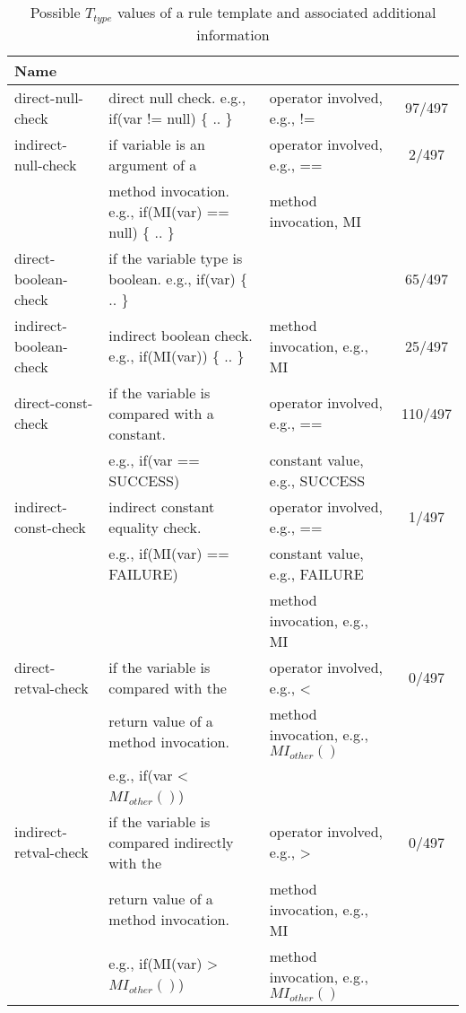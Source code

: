 \setlength{\tabcolsep}{1pt}
\begin{table*}[t]
\begin{SmallOut}
\begin{CodeOut}
\begin{center}
\centering \caption {\label{tab:conditiontypes} Possible $T_{type}$ values of a rule template and associated
additional information}
\begin {tabular} {|l|l|l|c|}
\hline
Name&\CenterCell{Description}&\CenterCell{Additional Info}&\CenterCell{Coverage}\\
\hline
\hline direct-null-check&direct null check. e.g., if(var != null) \{ .. \}&operator involved, e.g., != & 97/497\\
\hline indirect-null-check&if variable is an argument of a &operator involved, e.g., == & 2/497 \\
		   &method invocation. e.g., if(MI(var) == null) \{ .. \}&method invocation, MI&\\
\hline direct-boolean-check&if the variable type is boolean. e.g., if(var) \{ .. \}& &65/497\\
\hline indirect-boolean-check&indirect boolean check. e.g., if(MI(var)) \{ .. \}&method invocation, e.g., MI& 25/497\\
\hline direct-const-check&if the variable is compared with a constant.&operator involved, e.g., ==&110/497\\
			 & e.g., if(var == SUCCESS)&constant value, e.g., SUCCESS&\\
\hline indirect-const-check&indirect constant equality check.&operator involved, e.g., ==&1/497\\
		 	 & e.g., if(MI(var) == FAILURE)&constant value, e.g., FAILURE&\\
		 	 & &method invocation, e.g., MI&\\
\hline direct-retval-check&if the variable is compared with the&operator involved, e.g., <&0/497\\
			 &return value of a method invocation.&method invocation, e.g., $MI_{other}()$&\\
			 &e.g., if(var < $MI_{other}()$)&&\\ 
\hline indirect-retval-check&if the variable is compared indirectly with the&operator involved, e.g., >&0/497\\
			 &return value of a method invocation.&method invocation, e.g., MI&\\
			 &e.g., if(MI(var) > $MI_{other}()$)&method invocation, e.g., $MI_{other}()$&\\ 

\end{tabular}
\end{center}
\end{CodeOut}
\end{SmallOut}
\end{table*}
